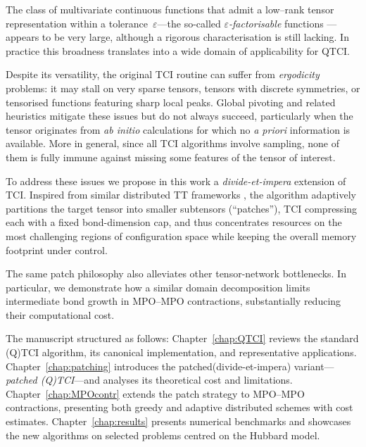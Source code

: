The class of multivariate continuous functions that admit a low–rank tensor representation within a tolerance~$\varepsilon$—the so-called \emph{$\varepsilon$-factorisable} functions \cite{Fernandez2022}—appears to be
very large, although a rigorous characterisation is still lacking.  In practice this broadness translates into a wide domain of applicability for QTCI. 

Despite its versatility, the original TCI routine can suffer from \emph{ergodicity} problems: it may stall on very sparse tensors, tensors with
discrete symmetries, or tensorised functions featuring sharp local peaks. Global pivoting and related heuristics \cite{Fernandez2024} mitigate these issues but do not always succeed, particularly when the tensor originates from \textit{ab initio} calculations for which no \emph{a priori} information is available. More in general, since all TCI algorithms involve sampling, none of them is fully immune against missing some features of the tensor of interest.

To address these issues we propose in this work a \emph{divide-et-impera} extension of TCI. Inspired from similar distributed TT frameworks \cite{Hiroshi2023,Ehrlacher2021}, the algorithm adaptively partitions the target tensor into smaller subtensors (“patches”), TCI compressing each with a fixed bond-dimension cap, and thus concentrates resources on the most challenging regions of configuration space while keeping the overall memory footprint under control. 

The same patch philosophy also alleviates other tensor-network bottlenecks. In particular, we demonstrate how a similar domain decomposition limits intermediate bond growth in MPO–MPO contractions, substantially reducing their computational cost.


The manuscript structured as follows: Chapter~\ref{chap:QTCI} reviews the standard (Q)TCI algorithm, its canonical implementation, and representative applications. Chapter~\ref{chap:patching} introduces the patched(divide-et-impera) variant—\emph{patched (Q)TCI}—and analyses its theoretical cost and limitations. Chapter~\ref{chap:MPOcontr} extends the patch strategy to MPO–MPO contractions, presenting both greedy and adaptive distributed schemes with cost estimates. Chapter~\ref{chap:results} presents numerical benchmarks and showcases the new algorithms on selected problems centred on the Hubbard model.


